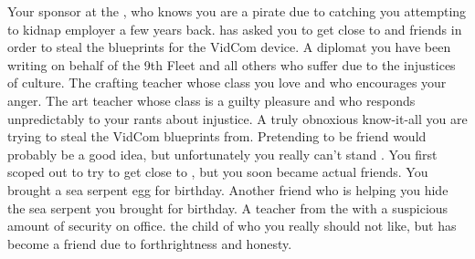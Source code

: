 \documentclass[char]{GL2020}
\begin{document}
\begin{contacts}
    \contact{\cChupLeader{}} Your sponsor at the \pSc{}, who knows you are a pirate due to catching you attempting to kidnap \cChupLeader{\their} employer a few years back. \cChupLeader{} has asked you to get close to \cTechStar{} and \cTechStar{\their} friends in order to steal the blueprints for the VidCom device.
    \contact{\cJuniorStatesman{}} A diplomat you have been writing on behalf of the 9th Fleet and all others who suffer due to the injustices of \pShippie{} culture.
    \contact{\cPirate{}} The crafting teacher whose class you love and who encourages your anger.
    \contact{\cChupAvenger{}} The art teacher whose class is a guilty pleasure and who responds unpredictably to your rants about injustice.
    \contact{\cTechStar{}} A truly obnoxious know-it-all you are trying to steal the VidCom blueprints from. Pretending to be \cTechStar{\their} friend would probably be a good idea, but unfortunately you really can’t stand \cTechStar{\them}.
    \contact{\cDisney{}} You first scoped \cDisney{\them} out to try to get close to \cTechStar{}, but you soon became actual friends. You brought \cDisney{\them} a sea serpent egg for \cDisney{\their} birthday.
    \contact{\cAdopted{}} Another friend who is helping you hide the sea serpent you brought \cDisney{} for \cDisney{\their} birthday.
    \contact{\cChupInventor{}} A teacher from the \pTech{} with a suspicious amount of security on \cChupInventor{\their} office.
    \contact{\cWarlordDaughter{}} the child of \cLoud{} who you really should not like, but has become a friend due to \cWarlordDaughter{\their} forthrightness and honesty.
\end{contacts}
\end{document}
